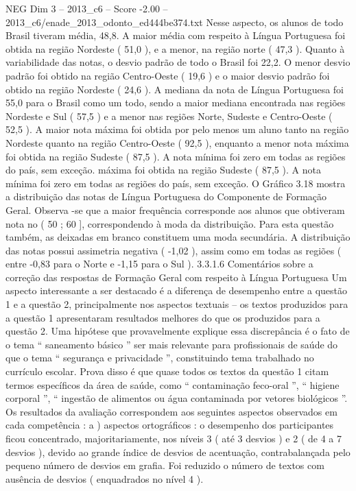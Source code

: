 \begin{textsample}{NEG Dim 3 – 2013\_c6 – Score -2.00 – 2013\_c6/enade\_2013\_odonto\_ed444be374.txt}
Nesse aspecto, os alunos de todo Brasil tiveram média, 48,8.
A maior média com respeito à Língua Portuguesa foi obtida na região Nordeste ( 51,0 ), e a menor, na região norte ( 47,3 ).
Quanto à variabilidade das notas, o desvio padrão de todo o Brasil foi 22,2.
O menor desvio padrão foi obtido na região Centro-Oeste ( 19,6 ) e o maior desvio padrão foi obtido na região Nordeste ( 24,6 ).
A mediana da nota de Língua Portuguesa foi 55,0 para o Brasil como um todo, sendo a maior mediana encontrada nas regiões Nordeste e Sul ( 57,5 ) e a menor nas regiões Norte, Sudeste e Centro-Oeste ( 52,5 ).
A maior nota máxima foi obtida por pelo menos um aluno tanto na região Nordeste quanto na região Centro-Oeste ( 92,5 ), enquanto a menor nota máxima foi obtida na região Sudeste ( 87,5 ).
A nota mínima foi zero em todas as regiões do país, sem exceção. máxima foi obtida na região Sudeste ( 87,5 ).
A nota mínima foi zero em todas as regiões do país, sem exceção.
O Gráfico 3.18 mostra a distribuição das notas de Língua Portuguesa do Componente de Formação Geral.
Observa -se que a maior frequência corresponde aos alunos que obtiveram nota no ( 50 ; 60 ], correspondendo à moda da distribuição.
Para esta questão também, as deixadas em branco constituem uma moda secundária.
A distribuição das notas possui assimetria negativa ( -1,02 ), assim como em todas as regiões ( entre -0,83 para o Norte e -1,15 para o Sul ). 3.3.1.6 Comentários sobre a correção das respostas de Formação Geral com respeito à Língua Portuguesa Um aspecto interessante a ser destacado é a diferença de desempenho entre a questão 1 e a questão 2, principalmente nos aspectos textuais – os textos produzidos para a questão 1 apresentaram resultados melhores do que os produzidos para a questão 2.
Uma hipótese que provavelmente explique essa discrepância é o fato de o tema “ saneamento básico ” ser mais relevante para profissionais de saúde do que o tema “ segurança e privacidade ”, constituindo tema trabalhado no currículo escolar.
Prova disso é que quase todos os textos da questão 1 citam termos específicos da área de saúde, como “ contaminação feco-oral ”, “ higiene corporal ”, “ ingestão de alimentos ou água contaminada por vetores biológicos ”.
Os resultados da avaliação correspondem aos seguintes aspectos observados em cada competência : a ) aspectos ortográficos : o desempenho dos participantes ficou concentrado, majoritariamente, nos níveis 3 ( até 3 desvios ) e 2 ( de 4 a 7 desvios ), devido ao grande índice de desvios de acentuação, contrabalançada pelo pequeno número de desvios em grafia.
Foi reduzido o número de textos com ausência de desvios ( enquadrados no nível 4 ).

\end{textsample}
